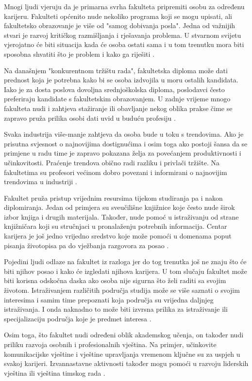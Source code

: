 \documentclass[]{foi}
\begin{document}
Mnogi ljudi vjeruju da je primarna svrha fakulteta pripremiti osobu za određenu karijeru. Fakulteti općenito nude nekoliko programa koji se mogu upisati, ali fakultetsko obrazovanje
je više od "samog dobivanja posla". Jedna od važnijih stvari je razvoj kritičkog razmišljanja i rješavanja problema. U stvarnom svijetu vjerojatno će biti situacija kada će osoba ostati
sama i u tom trenutku mora biti sposobna shvatiti što je problem i kako ga riješiti \cite{bisio2025college}. 

Na današnjem "konkurentnom tržištu rada", fakultetska diploma može dati prednost koja je potrebna kako bi se osoba izdvojila u moru ostalih kandidata. Iako je za dosta poslova dovoljna
srednjoškolska diploma, poslodavci često preferiraju kandidate s fakultetskim obrazovanjem. U zadnje vrijeme mnogo fakulteta nudi i zahtjeva stažiranje ili obavljanje nekog oblika prakse čime
se zapravo pruža prilika osobi dati uvid u buduću profesiju \cite{bisio2025college}. 

Svaka industrija više-manje zahtjeva da osoba bude u toku s trendovima. Ako je prisutna svjesnost o najnovijima dostignućima i osim toga ako postoji šansa da se primjene u radu time je zapravo 
pokazana želja za povećanjem produktivnosti i učinkovitosti. Praćenje trendova obično radi razliku i privlači tržište. Na fakultetima su profesori većinom dobro povezani i informirani
o najnovijim trendovima u industriji \cite{bisio2025college}.

Fakultet pruža pristup vrijednim resursima tijekom studiranja pa i nakon diplomiranja. Jedan od primjera su sveučilišne knjižnice koje često nude širok izbor knjiga i drugih materijala.
Također, nude pomoć u istraživanju od strane knjižničara koji su stručnjaci u pronalaženju potrebnih informacija. Centar karijera je još jedno vrijedno sredstvo koje može pomoći u domenama
poput pisanja životopisa pa do vježbanja razgovora za posao \cite{bisio2025college}. 

Pojedini ljudi odlaze na fakultet iz razloga jer do tog trenutka još ne znaju što će biti njihov posao i kako će izgledati njihova karijera. U tom slučaju fakultet može biti korisna odskočna
daska ako osoba nije sigurna što želi raditi sa svojim životom. Istraživanjem različitih područja studija može se više saznati o svojim interesima i samim time prepoznati koja područja su vrijedna
daljnjeg istraživanja. I onda naknadno to može biti izvrsna prilika za istraživanje ili specijalizaciju područja koje je predmet interesa \cite{bisio2025college}.

Osim toga, što fakultet nudi određeni oblik akademskog učenja, on također nudi priliku razvoja osobnih i profesionalnih vještina. Na primjer, učinkovite komunikacijske vještine i vještine upravljanja 
vremenom ključne su za uspjeh u svakoj karijeri. Izvannastavne aktivnosti također mogu pomoći u razvoju liderskih vještina ili vještina timskog rada \cite{bisio2025college}.
\end{document}
